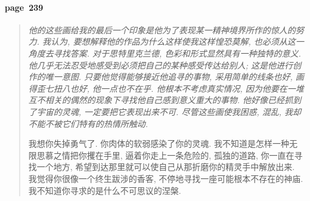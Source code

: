 \paragraph*{page~239}
\begin{quotation}
    \itshape
    他的这些画给我的最后一个印象是他为了表现某一精神境界所作的惊人的努力. 我认为, 要想解释他的作品为什么这样使我这样惶恐莫解, 也必须从这一角度去寻找答案. 对于思特里克兰德, 色彩和形式显然具有一种独特的意义. 他几乎无法忍受地感受到必须把自己的某种感受传达给别人; 这是他进行创作的唯一意图. 只要他觉得能够接近他追寻的事物, 采用简单的线条也好, 画得歪七扭八也好, 他一点也不在乎. 他根本不考虑真实情况, 因为他要在一堆互不相关的偶然的现象下寻找他自己感到意义重大的事物. 他好像已经抓到了宇宙的灵魂, 一定要把它表现出来不可. 尽管这些画使我困惑, 混乱, 我却不能不被它们特有的热情所触动.

    我想你失掉勇气了. 你肉体的软弱感染了你的灵魂. 我不知道是怎样一种无限思慕之情把你攫在手里, 逼着你走上一条危险的, 孤独的道路, 你一直在寻找一个地方, 希望到达那里就可以使自己从那折磨你的精灵手中解放出来. 我觉得你很像一个终生跋涉的香客, 不停地寻找一座可能根本不存在的神庙. 我不知道你寻求的是什么不可思议的涅槃. 
\end{quotation}

